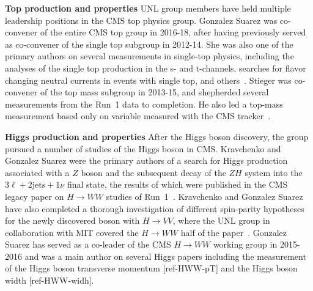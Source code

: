 {\bf Top production and properties} 
UNL group members have held multiple leadership positions in the CMS top
physics group.  Gonzalez Suarez was co-convener of the entire CMS top group
in 2016-18, after having previously served as co-convener of the single top
subgroup in 2012-14.  She was also one of the primary authors on several
measurements in single-top physics, including the analyses of the single
top production in the s- and t-channels, searches for flavor changing
neutral currents in events with single top, and
others~\cite{bib:single-top-papers}.  Stieger was co-convener of the top
mass subgroup in 2013-15, and shepherded several measurements from the
Run~1 data to completion.  He also led a top-mass measurement based only on
variable measured with the CMS tracker~\cite{bib:tracker-top-mass}.

{\bf Higgs production and properties}
After the Higgs boson discovery, the group pursued a number of studies of the Higgs boson in CMS. Kravchenko and Gonzalez Suarez were the primary authors of a search for Higgs production associated with a $Z$ boson and the subsequent decay of the $ZH$ system into the $3\ell+2\text{jets}+1\nu$ final state, the results of which were published in the CMS legacy paper on $H\rightarrow WW$ studies of Run~1~\cite{bib:HWWlegacy}. Kravchenko and Gonzalez Suarez have also completed a thorough investigation of different spin-parity hypotheses for the newly discovered boson with $H\rightarrow VV$, where the UNL group in collaboration with MIT covered the $H\rightarrow WW$ half of the paper~\cite{bib:higgs-spin-parity}. Gonzalez Suarez has served as a co-leader of the CMS $H\to WW$ working group in 2015-2016 and was a main author on several Higgs papers including the measurement of the Higgs boson transverse momentum [ref-HWW-pT] and the Higgs boson width [ref-HWW-widh].

